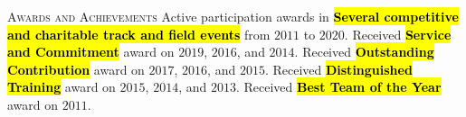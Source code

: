 \begin{rubric}{\textsc{Awards and Achievements}}
%
 Active participation awards in \hl{\textbf{Several competitive and charitable track and field events}} from \emph{$2011$} to \emph{$2020$}.
%
 Received \hl{\textbf{Service and Commitment}} award on $2019$, $2016$, and $2014$.
%
 Received \hl{\textbf{Outstanding Contribution}} award on $2017$, $2016$, and $2015$.
%
 Received \hl{\textbf{Distinguished Training}} award on $2015$, $2014$, and $2013$.
%
 Received \hl{\textbf{Best Team of the Year}} award on $2011$.
%
\end{rubric}